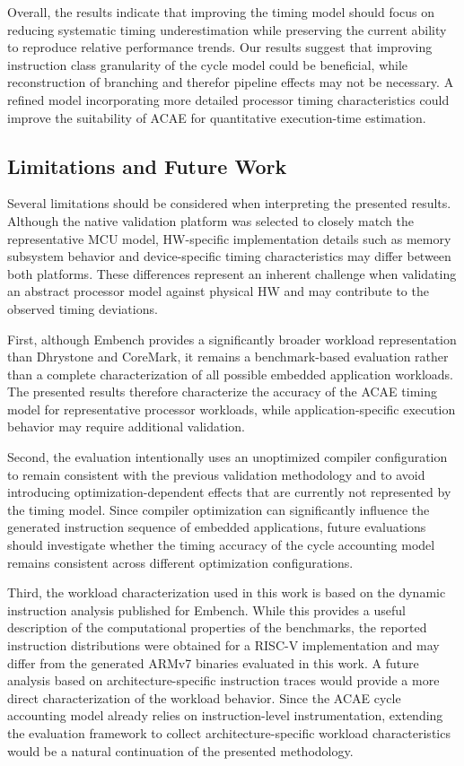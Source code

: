 \documentclass[conference]{IEEEtran}
\begin{document}
			Overall, the results indicate that improving the timing model should focus on reducing systematic timing underestimation while preserving the current ability to reproduce relative performance trends.
			Our results suggest that improving instruction class granularity of the cycle model could be beneficial, while reconstruction of branching and therefor pipeline effects may not be necessary.
			A refined model incorporating more detailed processor timing characteristics could improve the suitability of \ac{ACAE} for quantitative execution-time estimation.
		
		\subsection{Limitations and Future Work}

			Several limitations should be considered when interpreting the presented results.
			Although the native validation platform was selected to closely match the representative MCU model, \ac{HW}-specific implementation details such as memory subsystem behavior and device-specific timing characteristics may differ between both platforms.
			These differences represent an inherent challenge when validating an abstract processor model against physical \ac{HW} and may contribute to the observed timing deviations.

			First, although Embench provides a significantly broader workload representation than Dhrystone and CoreMark, it remains a benchmark-based evaluation rather than a complete characterization of all possible embedded application workloads.
			The presented results therefore characterize the accuracy of the \ac{ACAE} timing model for representative processor workloads, while application-specific execution behavior may require additional validation.

			Second, the evaluation intentionally uses an unoptimized compiler configuration to remain consistent with the previous validation methodology and to avoid introducing optimization-dependent effects that are currently not represented by the timing model.
			Since compiler optimization can significantly influence the generated instruction sequence of embedded applications, future evaluations should investigate whether the timing accuracy of the cycle accounting model remains consistent across different optimization configurations.

			Third, the workload characterization used in this work is based on the dynamic instruction analysis published for Embench.
			While this provides a useful description of the computational properties of the benchmarks, the reported instruction distributions were obtained for a RISC-V implementation and may differ from the generated ARMv7 binaries evaluated in this work.
			A future analysis based on architecture-specific instruction traces would provide a more direct characterization of the workload behavior.
			Since the \ac{ACAE} cycle accounting model already relies on instruction-level instrumentation, extending the evaluation framework to collect architecture-specific workload characteristics would be a natural continuation of the presented methodology.
\end{document}
